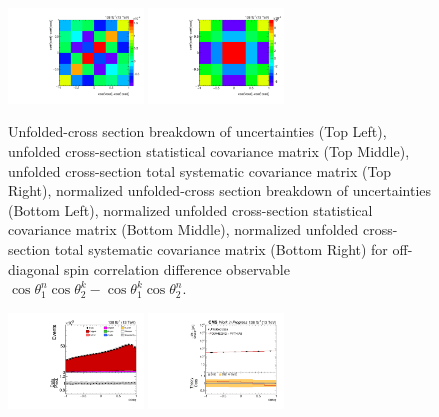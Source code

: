 \begin{refsection}
\begin{figure}[htb]
\begin{center}
 \includegraphics[width=0.32\textwidth]{fig_fullRun2UL/unfolding/combined/StatCovMatrixNorm_rebinnedB_c_Mnk.pdf}
 \includegraphics[width=0.32\textwidth]{fig_fullRun2UL/unfolding/combined/TotalSystCovMatrixNorm_rebinnedB_c_Mnk.pdf} \\
\caption{Unfolded-cross section breakdown of uncertainties (Top Left), unfolded cross-section statistical covariance matrix (Top Middle), unfolded cross-section total systematic covariance matrix (Top Right), normalized unfolded-cross section breakdown of uncertainties (Bottom Left), normalized unfolded cross-section statistical covariance matrix (Bottom Middle), normalized unfolded cross-section total systematic covariance matrix (Bottom Right) for off-diagonal spin correlation difference observable $\cos\theta_{1}^{n}\cos\theta_{2}^{k}-\cos\theta_{1}^{k}\cos\theta_{2}^{n}$.}
\label{fig:c_Mnk_uncertainties}
\end{center}
\end{figure}
\clearpage
\begin{figure}[htb]
\begin{center}
 \includegraphics[width=0.32\textwidth]{fig_fullRun2UL/controlplots/combined/Hyp_LLBarcHel.pdf}
 \includegraphics[width=0.32\textwidth]{fig_fullRun2UL/unfolding/combined/UnfoldedResults_ll_cHel.pdf}

\end{center}
\end{figure}
\end{refsection}
